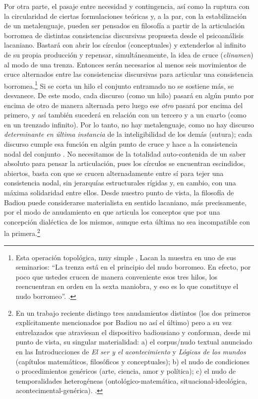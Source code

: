 Por otra parte, el pasaje entre necesidad y contingencia, así como la ruptura con la circularidad de ciertas formulaciones teóricas y, a la par, con la estabilización de un metalenguaje, pueden ser pensados en filosofía a partir de la articulación borromea de distintas consistencias discursivas propuesta desde el psicoanálisis lacaniano. Bastará con abrir los círculos (conceptuales) y extenderlos al infinito de su propia producción y repensar, simultáneamente, la idea de cruce (\emph{clinamen}) al modo de una trenza. Entonces serán necesarios al menos seis movimientos de cruce alternados entre las consistencias discursivas para articular una consistencia borromea.\footnote{Esta operación topológica, muy simple , Lacan la muestra en uno de sus seminarios: \enquote{La trenza está en el principio del nudo borromeo. En efecto, por poco que ustedes crucen de manera conveniente esos tres hilos, los reencuentran en orden en la sexta maniobra, y eso es lo que constituye el nudo borromeo}. \cite[Véase][]{@7148-LACAN1976-1977}.} Si se corta un hilo el conjunto entramado no se sostiene más, se desvanece. De este modo, cada discurso (como un hilo) pasará en algún punto por encima de otro de manera alternada  pero luego ese \emph{otro} pasará por encima del primero, y así también sucederá en relación con un tercero y a un cuarto (como en un trenzado infinito). Por lo tanto, no hay metalenguaje, como no hay discurso \emph{determinante en última instancia} de la inteligibilidad de los demás (sutura); cada discurso cumple esa función en algún punto de cruce y hace a la consistencia nodal del conjunto . No necesitamos de la totalidad auto-contenida de un saber absoluto para pensar la articulación, pues los círculos se encuentran escindidos, abiertos, basta con que se crucen alternadamente entre sí para tejer una consistencia nodal, sin jerarquías estructurales rígidas y, en cambio, con una máxima solidaridad entre ellos. Desde nuestro punto de vista, la filosofía de Badiou puede considerarse materialista en sentido lacaniano, más precisamente, por el modo de anudamiento en que articula los conceptos que por una concepción dialéctica de los mismos, aunque esta última no sea incompatible con la primera.\footnote{En un trabajo reciente distingo tres anudamientos distintos (los dos primeros explícitamente mencionados por Badiou no así el último) pero a su vez entrelazados que atraviesan el dispositivo badiousiano y conforman, desde mi punto de vista, su singular materialidad: a) el corpus/nudo textual anunciado en las Introducciones de \emph{El ser y el acontecimiento} y \emph{Lógicas de los mundos} (capítulos matemáticos, filosóficos y conceptuales); b) el nudo de condiciones o procedimientos genéricos (arte, ciencia, amor y política); c) el nudo de temporalidades heterogéneas (ontológico-matemática, situacional-ideológica, acontecimental-genérica). \cite[][]{@7133-FARRAN2010}.}

